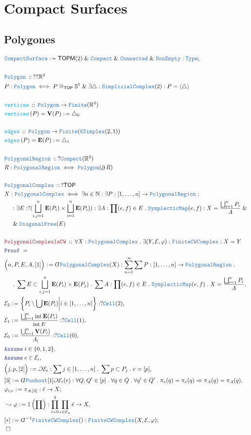 \documentclass[12pt]{scrartcl}
\newcommand{\TYPE}[1]{\textcolor{NavyBlue}{\mathtt{#1}}}
\newcommand{\FUNC}[1]{\textcolor{Cerulean}{\mathtt{#1}}}
\newcommand{\LOGIC}[1]{\textcolor{Blue}{\mathtt{#1}}}
\newcommand{\THM}[1]{\textcolor{Maroon}{\mathtt{#1}}}
\renewcommand{\.}{\; . \;}
\newcommand{\de}{: \kern 0.1pc =}
\newcommand{\Act}[1]{\left( #1 \right)}
\newcommand{\Theorem}[2]{& \THM{#1} \, :: \, #2 \\ & \Proof = \\ }
\newcommand{\DeclareType}[2]{& \TYPE{#1} \, :: \, #2 \\}
\newcommand{\DefineType}[3]{& #1 : \TYPE{#2} \iff #3 \\}
\newcommand{\DeclareFunc}[2]{& \FUNC{#1} \, :: \, #2 \\}
\newcommand{\DefineNamedFunc}[4]{&  \FUNC{#1}\Act{#2} = #3 \de #4 \\}
\newcommand{\NewLine}{\\ & \kern 1pc}
\newcommand{\Page}[1]{ \begin{align*} #1 \end{align*}   }
\newcommand{ \bd }{ \ByDef }
\renewcommand{\And}{\; \& \;}
\newcommand{\Imply}{\Rightarrow}
\newcommand{\Intro}{\LOGIC{I}}
\newcommand{\Type}{\TYPE{Type}}
\newcommand{\Reals}{\mathbb{R} }
\newcommand{\Sphere}{\mathbb{S}}
\newcommand{\Nat}{\mathbb{N} }
\newcommand{\Say}[3]{& #1 \de #2 : #3, \\}
\newcommand{\Conclude}[3]{& #1 \de #2 : #3; \\}
\newcommand{\Derive}[3]{& \leadsto #1 \de #2 : #3, \\}
\newcommand{\AssumeIn}[2]{& \LOGIC{Assume} \; #1 \in #2, \\}
\newcommand{\QED}{\; \square}
\newcommand{\EndProof}{& \QED \\}
\newcommand{\ByDef}{\rotatebox[origin=c]{-180}{$D$}}%
\newcommand{\ByConstr}{\rotatebox[origin=c]{-180}{$C$}}%
\newcommand{\Proof}{\LOGIC{Proof} \; }
\DeclareMathOperator*{\intx}{int}
\DeclareMathOperator*{\boundary}{\partial}
\newcommand{\TOP}{\mathsf{TOP}}
\newcommand{\SC}{\TYPE{SimplicialComplex}}
\newcommand{\CS}{\TYPE{CompactSurface}}
\newcommand{\TOPM}{\mathsf{TOPM}}
\newcommand{\E}{\mathcal{E}}
\begin{document}
\section{Compact Surfaces}
\subsection{Polygones}
\Page{
	\Conclude{\CS}{\TOPM(2) \And \TYPE{Compact} \And \TYPE{Connected} \And \TYPE{NonEmpty} }{\Type}
	\\
	\DeclareType{Polygon}{??\Reals^2}
	\DefineType{P}{Polygon}{ 
		P \cong_{\TOP} \Sphere^1 
		\And 
		\exists \triangle : \SC(2) : P = \langle \triangle \rangle
	}
	\\
	\DeclareFunc{vertices}{\TYPE{Polygon} \to \TYPE{Finite}(\Reals^2)}
	\DefineNamedFunc{vertices}{P}{\mathbf{V}(P)}{\triangle_0}
	\\
	\DeclareFunc{edges}{\TYPE{Polygon} \to \TYPE{Finite}(\TYPE{KSimplex}(2,1))}
	\DefineNamedFunc{edges}{P}{\mathbf{E}(P)}{\triangle_1}
	\\
	\DeclareType{PolygonalRegion}{?\TYPE{Compact}(\Reals^2)}
	\DefineType{R}{PolygonalRegion}{\TYPE{Polygon}(\boundary R)}
	\\
	\DeclareType{PolygonalComplex}{ ?\TOP  }
	\DefineType{X}{PolygonalComplex}
	{
		\exists n \in \Nat :
		\exists P : [1,\ldots,n] \to \TYPE{PolygonalRegion} :
		\NewLine :
		\exists E : 
		?(\bigsqcup^n_{i,j=1}\mathbf{E}(P_i) 
			\times \bigsqcup^n_{i=1} \mathbf{E}(P_i)) :
		\exists A : \prod (e,f) \in E \. \TYPE{SymplecticMap}(e,f) :
		X = \frac{\bigsqcup^n_{i=1} P_i}{A}
		\And \NewLine \And
		\TYPE{DiogonalFree}(E)
	}
	\\
	\Theorem{PolygonalComplexIsCW}
	{
		\forall X : \TYPE{PolygonalComplex} \.
		\exists (Y,\E,\varphi) : \TYPE{FiniteCWComplex} :
		X = Y
	}
	\Say{\Big(n,P,E,A,[1] \Big)}
	{ \bd \TYPE{PolygonalComplex}(X) }
	{
		\sum^\infty_{n=1} 
		\sum P : [1,\ldots,n] \to \TYPE{Polygonal Region} \. \NewLine \. 
		\sum E \subset  \bigsqcup^n_{i,j=1} \mathbf{E}(P_i) \times \mathbf{E}(P_j) \.
		\sum A : \prod (e,f) \in E \. \TYPE{SymplecticMap}(e,f) \.
		X = \frac{\bigsqcup^n_{i=1} P_i}{A}
	}
	\Say{\E_2}{\left\{  P_i \setminus \bigcup \mathbf{E}(P_i)   \bigg| i \in [1,\ldots,n]\right\}}
	{
	      ?\TYPE{Cell}(2)
	}
	\Say{\E_1}{ \frac{\bigsqcup^n_{i=1} \intx \mathbf{E}(P_i)}{\intx E} }
	{
		?\TYPE{Cell}(1)
	}
	\Say{\E_0}{ \frac{\bigcup^n_{i=1} \mathbf{V}(P_i)}{A_{|}} }{ ?\TYPE{Cell}(0)}
	\AssumeIn{i}{\{0,1,2\}}
	\AssumeIn{e}{\E_i}
	\Say{\Big(j,p,[2]\Big)}{\ByConstr \E_i}{\sum j \in [1,\ldots,n] \. \sum p \subset P_j \. e = [p]  }
	\Say{[3]}{\bd \TYPE{Pushout}[1]\ByConstr \E_i(e)}{
			\forall Q,Q' \in [p] \. 
			\forall q \in \bar Q \. 
			\forall q' \in \bar Q' \.   
			\pi_e(q) = \pi_e(q) \Imply
			\pi_A(q) = \pi_A(q) 
		}
	\Conclude{\varphi_{i,e}}{  \pi_{A,[3]}   }
	{
		\bar e \to X
	}
	\Derive{\varphi}
	{
		\Intro\Act{\prod}
	}
	{
		\prod_{i=0}^3 \prod_{e \in \E_n} \bar e  \to X
	}
	\Conclude{[*]}{\bd^{-1} \TYPE{FiniteCWComplex}() }
	{
		\TYPE{FiniteCWComplex}(X,\E,\varphi)
	}
	\EndProof
}
\end{document}
